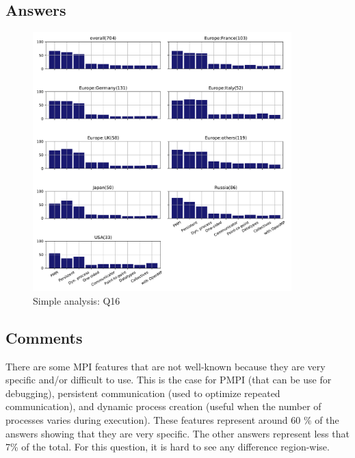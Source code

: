
\subsection{Answers}


\begin{figure}[htb]
\begin{center}
\includegraphics[width=10cm]{../pdfs/Q16.pdf}
\caption{Simple analysis: Q16}
\label{fig:Q16}
\end{center}
\end{figure}

\subsection{Comments}

There are some MPI features that are not well-known because they are very
specific and/or difficult to use. This is the case for PMPI (that can be use for
debugging), persistent communication (used to optimize repeated communication),
and dynamic process creation (useful when the number of processes varies during
execution). These features represent around  60 \% of the answers showing that
they are very specific. The other answers represent less that 7\% of the
total.  For this question, it is hard to see any difference region-wise.
